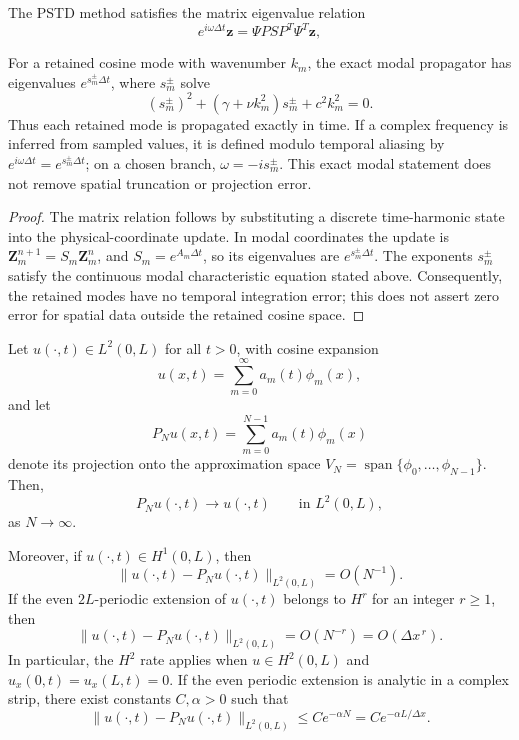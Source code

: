 \documentclass{Configuration_Files/PoliMi3i_thesis}
\begin{document}
\begin{proposition}
The PSTD method satisfies the matrix eigenvalue relation
\begin{equation}
e^{i\omega\Delta t}\mathbf z
=
\Psi
P
S
P^T
\Psi^T
\mathbf z,
\label{eq:matrix_dispersion}
\end{equation}

For a retained cosine mode with wavenumber $k_m$, the exact modal
propagator has eigenvalues $e^{s_m^\pm\Delta t}$, where $s_m^\pm$ solve
\[
(s_m^\pm)^2+(\gamma+\nu k_m^2)s_m^\pm+c^2k_m^2=0.
\]
Thus each retained mode is propagated exactly in time. If a complex frequency
is inferred from sampled values, it is defined modulo temporal aliasing by
$e^{i\omega\Delta t}=e^{s_m^\pm\Delta t}$; on a chosen branch,
$\omega=-i s_m^\pm$. This exact modal statement does not remove spatial
truncation or projection error.
\end{proposition}

\begin{proof}
The matrix relation follows by substituting a discrete time-harmonic state
into the physical-coordinate update. In modal coordinates the update is
$\mathbf Z_m^{n+1}=S_m\mathbf Z_m^n$, and $S_m=e^{A_m\Delta t}$, so its
eigenvalues are $e^{s_m^\pm\Delta t}$. The exponents $s_m^\pm$ satisfy the
continuous modal characteristic equation stated above. Consequently, the
retained modes have no temporal integration error; this does not assert zero
error for spatial data outside the retained cosine space.
\end{proof}

\begin{proposition} \label{prop:cosine_approximation_convergence}
Let $u(\cdot,t) \in L^2(0,L)$ for all $t > 0$, with cosine expansion
\[
u(x,t)
=
\sum_{m=0}^{\infty}
a_m(t)\phi_m(x),
\]
and let
\[
P_N u(x,t)
=
\sum_{m=0}^{N-1}
a_m(t)\phi_m(x)
\]
denote its projection onto the approximation space $V_N = \operatorname{span}\{\phi_0,\ldots,\phi_{N-1}\}$.
Then,
\[
P_N u(\cdot,t)\longrightarrow u(\cdot,t)
\qquad\text{in }L^2(0,L),
\]
as $N\rightarrow\infty$.

Moreover, if $u(\cdot,t)\in H^1(0,L)$, then
\[
\|u(\cdot,t)-P_N u(\cdot,t)\|_{L^2(0,L)}=O(N^{-1}).
\]
If the even $2L$-periodic extension of $u(\cdot,t)$ belongs to $H^r$ for an
integer $r\ge1$, then
\[
\|u(\cdot,t)-P_N u(\cdot,t)\|_{L^2(0,L)}
=O(N^{-r})=O(\Delta x^{\,r}).
\]
In particular, the $H^2$ rate applies when $u\in H^2(0,L)$ and
$u_x(0,t)=u_x(L,t)=0$. If the even periodic extension is analytic in a
complex strip, there exist constants $C,\alpha>0$ such that
\[
\|u(\cdot,t)-P_N u(\cdot,t)\|_{L^2(0,L)}
\le
Ce^{-\alpha N}
=
Ce^{-\alpha L/\Delta x}.
\]
\end{proposition}
\end{document}
